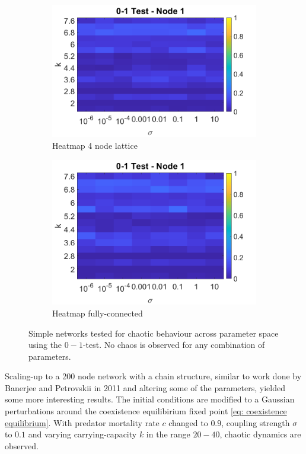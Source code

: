 \documentclass[12pt]{article}
\begin{document}
\begin{figure}[h]
    \begin{subfigure}[b]{0.2\linewidth}
        \centering
        \includegraphics[width=\textwidth]{Chaos Stuff/node1_4_lattice.png}
        \caption{Heatmap 4 node lattice}
        \label{fig:4 node lattice heatmap}
    \end{subfigure}
    \hfill
    \begin{subfigure}[b]{0.2\linewidth}
            \centering
            \includegraphics[width=\textwidth]{Chaos Stuff/node1_4_full.png}
            \caption{Heatmap fully-connected}
            \label{fig:4 node full heatmap}
    \end{subfigure}
    \label{fig: no chaos heatmaps}
    \caption{Simple networks tested for chaotic behaviour across parameter space using the $0-1$-test. No chaos is observed for any combination of parameters.}
\end{figure}
\noindent
Scaling-up to a 200 node network with a chain structure, similar to work done by Banerjee and Petrovskii in 2011 \cite{banerjee2011self} and altering some of the parameters, yielded some more interesting results. The initial conditions are modified to a Gaussian perturbations around the coexistence equilibirium fixed point \ref{eq: coexistence equilibrium}. With predator mortality rate $c$ changed to $0.9$, coupling strength $\sigma$ to $0.1$ and varying carrying-capacity $k$ in the range $20-40$, chaotic dynamics are observed.  \\ \\
\end{document}

